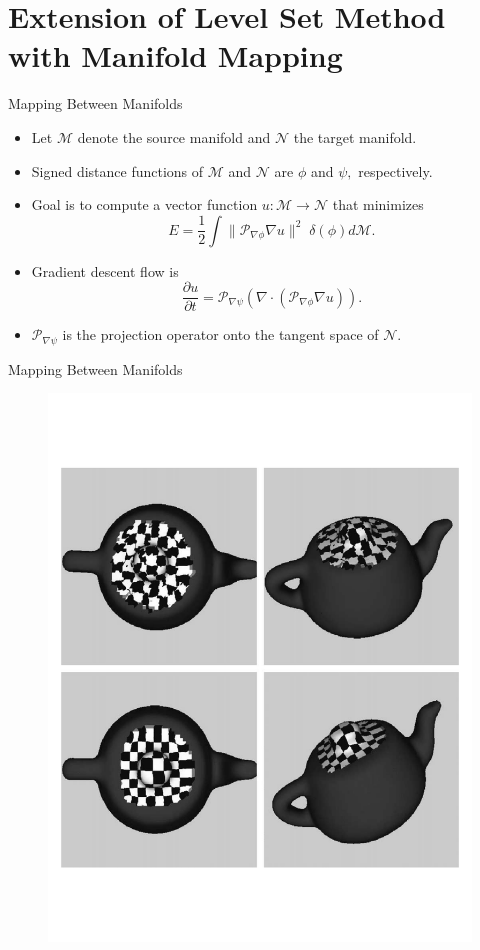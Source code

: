 \documentclass{beamer}
\begin{document}
\section{Extension of Level Set Method with Manifold Mapping}
\begin{frame}{Mapping Between Manifolds}
\begin{itemize}
\item Let $\mathcal{M}$ denote the source manifold and $\mathcal{N}$ the target manifold.
\item Signed distance functions of $\mathcal{M}$ and $\mathcal{N}$ are $\phi$ and $\psi,$ respectively.
\item Goal is to compute a vector function $u : \mathcal{M} \rightarrow \mathcal{N}$ that minimizes $$E=\frac{1}{2} \int \|\mathcal{P}_{\nabla \phi} \nabla u \|^2 \; \delta (\phi) d\mathcal{M}. $$ 
\item Gradient descent flow is $$\frac{\partial u}{\partial t} = \mathcal{P}_{\nabla \psi} (\nabla \cdot (\mathcal{P}_{\nabla \phi} \nabla u )) .$$
\item $\mathcal{P}_{\nabla \psi}$ is the projection operator onto the tangent space of $\mathcal{N}.$
\end{itemize}
\end{frame}

\begin{frame}{Mapping Between Manifolds}
\begin{figure}
\includegraphics[scale=0.35]{teapot.pdf}
\end{figure}
\end{frame}
\end{document}
